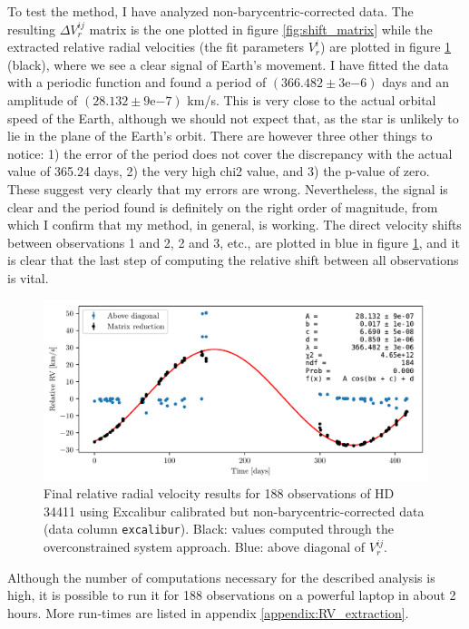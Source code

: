    To test the method, I have analyzed non-barycentric-corrected data. The resulting $\Delta V_r^{ij}$ matrix is the one plotted in figure \ref{fig:shift_matrix} while the extracted relative radial velocities (the fit parameters $V_r^i$) are plotted in figure \ref{fig:RV_results_non_barycentric} (black), where we see a clear signal of Earth's movement. I have fitted the data with a periodic function and found a  period of $(366.482 \pm 3\mathrm{e}{-6})$ days and an amplitude of $(28.132 \pm 9\mathrm{e}{-7})$ km/s. This is very close to the actual orbital speed of the Earth, although we should not expect that, as the star is unlikely to lie in the plane of the Earth's orbit. There are however three other things to notice: 1) the error of the period does not cover the discrepancy with the actual value of 365.24 days, 2) the very high chi2 value, and 3) the p-value of zero. These suggest very clearly that my errors are wrong. Nevertheless, the signal is clear and the period found is definitely on the right order of magnitude, from which I confirm that my method, in general, is working. The direct velocity shifts between observations 1 and 2, 2 and 3, etc.,  are plotted in blue in figure \ref{fig:RV_results_non_barycentric}, and it is clear that the last step of computing the relative shift between all observations is vital.

    \begin{figure}%
        \begin{wide}  
            \includegraphics[width=\textwidth]{figures/shift_non_bary_centric.pdf}
            \caption{Final relative radial velocity results for 188 observations of HD 34411 using Excalibur calibrated but non-barycentric-corrected data (data column \texttt{excalibur}). Black: values computed through the overconstrained system approach. Blue: above diagonal of $V_r^{ij}$.}
            \label{fig:RV_results_non_barycentric}
        \end{wide}
    \end{figure}


    Although the number of computations necessary for the described analysis is high, it is possible to run it for 188 observations on a powerful laptop in about 2 hours. More run-times are listed in appendix \ref{appendix:RV_extraction}.
    

